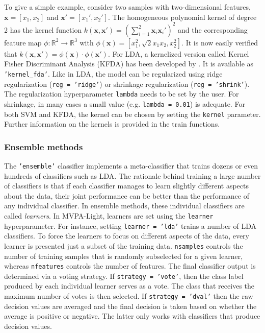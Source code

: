 \documentclass[utf8]{frontiersSCNS} %
\newcommand{\x}{\mathbf{x}}
\newcommand{\R}{\mathbb{R}}
\newcommand{\ttt}[1]{\texttt{#1}}
\begin{document}
To give a simple example, consider two samples with  two-dimensional features, $\x = [x_1, x_2]$ and $\x' = [x_1', x_2']$. The homogeneous polynomial kernel of degree 2 has the kernel function $k(\x,\x') = (\sum_{i=1}^2 \x_i\x_i')^2$ and the corresponding feature map $\phi:\R^2\rightarrow\R^3$ with $\phi(\x)= [x_1^2, \sqrt{2}x_1 x_2, x_2^2]$. It is now easily verified that $k(\x,\x') = \phi(\x)\cdot\phi(\x')$. For LDA, a kernelized version called Kernel Fisher Discriminant Analysis (KFDA) has been developed by \cite{Mika1999FisherKernels}. It is available as \ttt{'kernel\_fda'}. Like in LDA, the model can be regularized using ridge regularization (\ttt{reg = 'ridge'}) or shrinkage regularization (\ttt{reg = 'shrink'}). The regularization hyperparameter \ttt{lambda} needs to be set by the user. For shrinkage, in many cases a small value (e.g. \ttt{lambda = 0.01}) is adequate. For both SVM and KFDA, the kernel can be chosen by setting the \ttt{kernel} parameter. Further information on the kernels is provided in the train functions.

\subsubsection{Ensemble methods}

The \ttt{'ensemble'} classifier implements a meta-classifier that trains dozens
or even hundreds of classifiers such as LDA. The rationale behind training a large number of classifiers is that if each classifier manages to learn slightly different aspects about the data, their joint performance can be better than the performance of any individual classifier.
In ensemble methods, these individual classifiers are called \textit{learners}. In MVPA-Light, learners are set using the \ttt{learner} hyperparameter. For instance, setting \ttt{learner = 'lda'} trains a number of LDA classifiers. To force the learners to focus on different aspects of the data, every learner is presented just a subset of the training data. \ttt{nsamples} controls the number of training samples that is randomly subselected for a given learner, whereas \ttt{nfeatures} controls the number of features.
The final classifier output is determined via a voting strategy. If \ttt{strategy = 'vote'}, then the class label produced by each individual learner serves as a vote. The class that receives the maximum number of votes is then selected. If \ttt{strategy = 'dval'}  then the raw decision values are averaged and the final decision is taken based on whether the average is positive or negative. The latter only works with classifiers that produce decision values.
\end{document}
